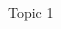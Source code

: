 \documentclass[10pt,xcolor=dvipsnames]{beamer}
\begin{document}
\begin{frame}{Topic 1}
\begin{columns}
\begin{column}{0.485\textwidth}
\end{column}
\begin{column}{0.45\textwidth}
\hspace{-6mm}

\end{column}
\end{columns}
\end{frame}
\end{document}
